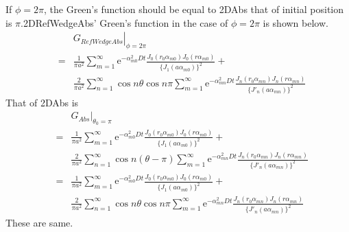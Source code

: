 \documentclass{article}
\begin{document}
If $\phi = 2\pi$, the Green's function should be equal to 2DAbs
that of initial position is $\pi$.2DRefWedgeAbs' Green's function in the case of $\phi = 2\pi$ is shown below.
\begin{eqnarray}
      & & \left.G_{RefWedgeAbs}\right|_{\phi = 2\pi}\nonumber \\
      &=& \frac{1}{\pi a^2} \sum^{\infty}_{m=1}
          \mathrm{e}^{-\alpha_{m0}^2Dt}
          \frac{J_0(r_0\alpha_{m0})
                J_0(r\alpha_{m0})}
               {\{J_1(a\alpha_{m0})\}^2}+\nonumber\\
      & & \frac{2}{\pi a^2}\sum^{\infty}_{n=1}
          \cos n\theta\cos n\pi
          \sum^{\infty}_{m=1}
          \mathrm{e}^{-\alpha_{mn}^2Dt}
          \frac{J_n(r_0\alpha_{mn})
                J_n(r\alpha_{mn})}
               {\{J'_n(a\alpha_{mn})\}^2}\nonumber 
\end{eqnarray}
That of 2DAbs is
\begin{eqnarray}
      & & \left.G_{Abs}\right|_{\theta_0 = \pi}\nonumber\\
      &=& \frac{1}{\pi a^2} \sum^{\infty}_{m=1}
          \mathrm{e}^{-\alpha_{m0}^2Dt}
          \frac{J_0(r_0\alpha_{m0})
                J_0(r\alpha_{m0})}
               {\{J_1(a\alpha_{m0})\}^2}+\nonumber\\
      & & \frac{2}{\pi a^2}\sum^{\infty}_{n=1}
          \cos n(\theta - \pi)
          \sum^{\infty}_{m=1}
          \mathrm{e}^{-\alpha_{mn}^2Dt}
          \frac{J_n(r_0\alpha_{mn})
                J_n(r\alpha_{mn})}
               {\{J'_n(a\alpha_{mn})\}^2} \nonumber \\
      &=& \frac{1}{\pi a^2} \sum^{\infty}_{m=1}
          \mathrm{e}^{-\alpha_{m0}^2Dt}
          \frac{J_0(r_0\alpha_{m0})
                J_0(r\alpha_{m0})}
               {\{J_1(a\alpha_{m0})\}^2}+\nonumber\\
      & & \frac{2}{\pi a^2}\sum^{\infty}_{n=1}
          \cos n\theta\cos n\pi
          \sum^{\infty}_{m=1}
          \mathrm{e}^{-\alpha_{mn}^2Dt}
          \frac{J_n(r_0\alpha_{mn})
                J_n(r\alpha_{mn})}
               {\{J'_n(a\alpha_{mn})\}^2} \nonumber 
\end{eqnarray}
These are same.
\end{document}
